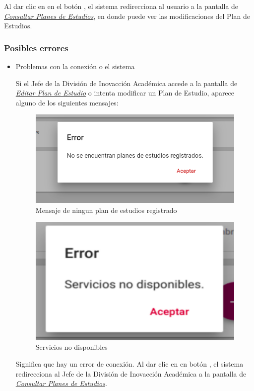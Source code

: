 Al dar clic en en el botón  , el sistema redirecciona al usuario a la pantalla de \hyperlink{consultarPE}{\textit{Consultar Planes de Estudios}}, en donde puede ver las modificaciones del Plan de Estudios.\\
\newpage
\subsubsection{Posibles errores}

\begin{itemize}
	\item Problemas con la conexión o el sistema

	Si el Jefe de la División de Inovacción Académica accede a la pantalla de \hyperlink{editarPE}{\textit{Editar Plan de Estudio}} o intenta modificar un Plan de Estudio, aparece alguno de los siguientes mensajes:

	\begin{figure}[H]
		\centering
		\hypertarget{ms3}{\includegraphics[width=0.7\linewidth]{images/SP4-GPE/m3}}
		\caption{Mensaje de ningun plan de estudios registrado}
		\label{ms3}
	\end{figure}
	\begin{figure}[H]
		\centering
		\hypertarget{error}{\includegraphics[width=0.7\linewidth]{images/SP4-GPE/error}}
		\caption{Servicios no disponibles}
		\label{error}
	\end{figure}


	Significa que hay un error de conexión. Al dar clic en en botón  , el sistema redirecciona al Jefe de la División de Inovacción Académica a la pantalla de \hyperlink{consultarPE}{\textit{Consultar Planes de Estudios}}.
	\newpage


\end{itemize}

